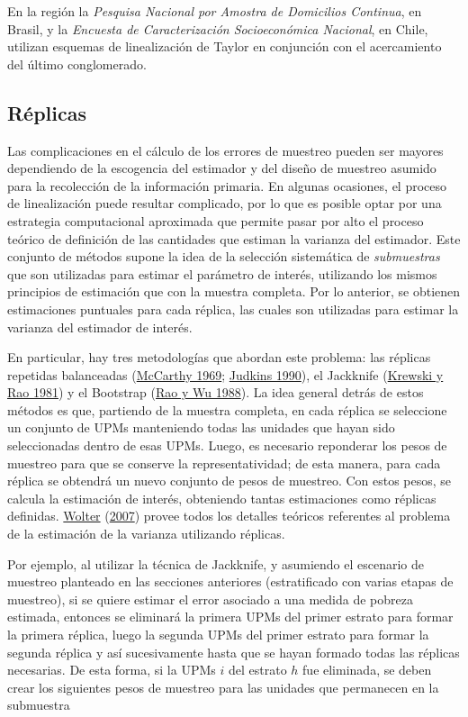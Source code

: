 \documentclass[
  12pt,
  spanish,
]{book}
\begin{document}
En la región la \emph{Pesquisa Nacional por Amostra de Domicilios Continua}, en Brasil, y la \emph{Encuesta de Caracterización Socioeconómica Nacional}, en Chile, utilizan esquemas de linealización de Taylor en conjunción con el acercamiento del último conglomerado.

\hypertarget{ruxe9plicas}{%
\subsection{Réplicas}\label{ruxe9plicas}}

Las complicaciones en el cálculo de los errores de muestreo pueden ser mayores dependiendo de la escogencia del estimador y del diseño de muestreo asumido para la recolección de la información primaria. En algunas ocasiones, el proceso de linealización puede resultar complicado, por lo que es posible optar por una estrategia computacional aproximada que permite pasar por alto el proceso teórico de definición de las cantidades que estiman la varianza del estimador. Este conjunto de métodos supone la idea de la selección sistemática de \emph{submuestras} que son utilizadas para estimar el parámetro de interés, utilizando los mismos principios de estimación que con la muestra completa. Por lo anterior, se obtienen estimaciones puntuales para cada réplica, las cuales son utilizadas para estimar la varianza del estimador de interés.

En particular, hay tres metodologías que abordan este problema: las réplicas repetidas balanceadas (\protect\hyperlink{ref-McCarthy_1969}{McCarthy 1969}; \protect\hyperlink{ref-Judkins_1990}{Judkins 1990}), el Jackknife (\protect\hyperlink{ref-Krewski_Rao_1981}{Krewski y Rao 1981}) y el Bootstrap (\protect\hyperlink{ref-Rao_Wu_1988}{Rao y Wu 1988}). La idea general detrás de estos métodos es que, partiendo de la muestra completa, en cada réplica se seleccione un conjunto de UPMs manteniendo todas las unidades que hayan sido seleccionadas dentro de esas UPMs. Luego, es necesario reponderar los pesos de muestreo para que se conserve la representatividad; de esta manera, para cada réplica se obtendrá un nuevo conjunto de pesos de muestreo. Con estos pesos, se calcula la estimación de interés, obteniendo tantas estimaciones como réplicas definidas. \protect\hyperlink{ref-Wolter_2007}{Wolter} (\protect\hyperlink{ref-Wolter_2007}{2007}) provee todos los detalles teóricos referentes al problema de la estimación de la varianza utilizando réplicas.

Por ejemplo, al utilizar la técnica de Jackknife, y asumiendo el escenario de muestreo planteado en las secciones anteriores (estratificado con varias etapas de muestreo), si se quiere estimar el error asociado a una medida de pobreza estimada, entonces se eliminará la primera UPMs del primer estrato para formar la primera réplica, luego la segunda UPMs del primer estrato para formar la segunda réplica y así sucesivamente hasta que se hayan formado todas las réplicas necesarias. De esta forma, si la UPMs \(i\) del estrato \(h\) fue eliminada, se deben crear los siguientes pesos de muestreo para las unidades que permanecen en la submuestra
\end{document}
